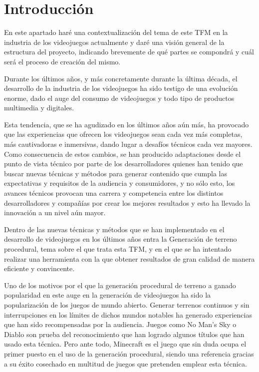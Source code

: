 
\section{Introducción}

En este apartado haré una contextualización del tema de este TFM en la industria de los videojuegos actualmente y daré una visión general de la estructura del proyecto, indicando brevemente de qué partes se compondrá y cuál será el proceso de creación del mismo.

Durante los últimos años, y más concretamente durante la última década, el desarrollo de la industria de los videojuegos ha sido testigo de una evolución enorme, dado el auge del consumo de videojuegos y todo tipo de productos multimedia y digitales.

Esta tendencia, que se ha agudizado en los últimos años aún más, ha provocado que las experiencias que ofrecen los videojuegos sean cada vez más completas, más cautivadoras e inmersivas, dando lugar a desafíos técnicos cada vez mayores. Como consecuencia de estos cambios, se han producido adaptaciones desde el punto de vista técnico por parte de los desarrolladores quienes han tenido que buscar nuevas técnicas y métodos para generar contenido que cumpla las expectativas y requisitos de la audiencia y consumidores, y no sólo esto, los avances técnicos provocan una carrera y competencia entre los distintos desarrolladores y compañías por crear los mejores resultados y esto ha llevado la innovación a un nivel aún mayor.

Dentro de las nuevas técnicas y métodos que se han implementado en el desarrollo de videojuegos en los últimos años entra la Generación de terreno procedural, tema sobre el que trata esta TFM, y en el que se ha intentado realizar una herramienta con la que obtener resultados de gran calidad de manera eficiente y convincente. 

Uno de los motivos por el que la generación procedural de terreno a ganado popularidad en este auge en la generación de videojuegos ha sido la popularización de los juegos de mundo abierto. Generar terrenos continuos y sin interrupciones en los límites de dichos mundos notables ha generado experiencias que han sido recompensadas por la audiencia. Juegos como No Man's Sky o Diablo son prueba del reconocimiento que han logrado algunos títulos que han usado esta técnica. Pero ante todo, Minecraft es el juego que sin duda ocupa el primer puesto en el uso de la generación procedural, siendo una referencia gracias a su éxito cosechado en multitud de juegos que pretenden emplear esta técnica.

